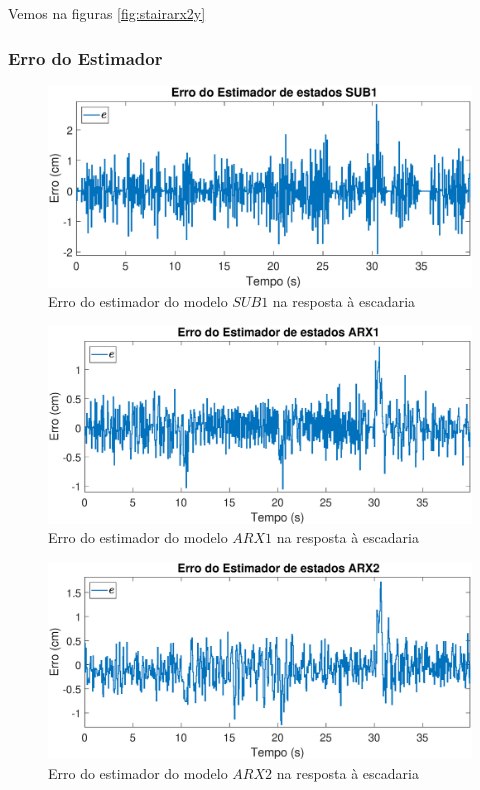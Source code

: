 Vemos na figuras \ref{fig:stairarx2y}

\subsubsection{Erro do Estimador} \label{erroest}

\begin{figure}[htb]
	\centering
	\includegraphics[width=1\linewidth]{errosub1}
	\caption[Erro do estimador do modelo $SUB1$ na resposta à escadaria]{Erro do estimador do modelo $SUB1$ na resposta à escadaria}
	\label{fig:errosub1}
\end{figure}

\begin{figure}[htb]
	\centering
	\includegraphics[width=1\linewidth]{erroarx1}
	\caption[Erro do estimador do modelo $ARX1$ na resposta à escadaria]{Erro do estimador do modelo $ARX1$ na resposta à escadaria}
	\label{fig:erroarx1}
\end{figure}

\begin{figure}[htb]
	\centering
	\includegraphics[width=1\linewidth]{erroarx2}
	\caption[Erro do estimador do modelo $ARX2$ na resposta à escadaria]{Erro do estimador do modelo $ARX2$ na resposta à escadaria}
	\label{fig:erroarx2}
\end{figure}


